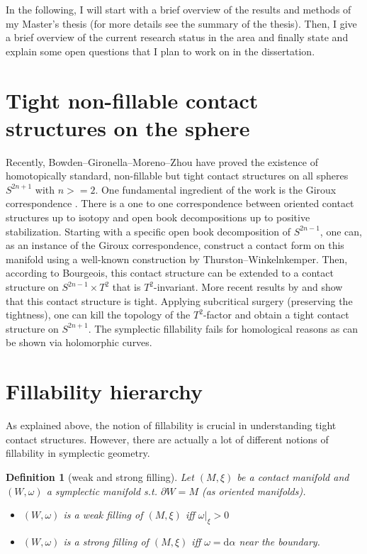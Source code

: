 \documentclass{amsart}
\newtheorem{definition}{Definition}
\renewcommand*{\d}{\mathrm{d}}
\begin{document}
In the following, I will start with a brief overview of the results and methods of my Master's thesis (for more details see the summary of the thesis).
Then, I give a brief overview of the current research status in the area and
finally state and explain some open questions that I plan to work on in the dissertation.

\section*{Tight non-fillable contact structures on the sphere}

Recently, Bowden--Gironella--Moreno--Zhou \cite{BGMZ22} have proved the existence of homotopically standard, non-fillable but tight contact structures on all spheres $S^{2n+1}$ with $n >= 2$. 
One fundamental ingredient of the work is the Giroux correspondence \cite{Giroux02}.
There is a one to one correspondence between oriented contact structures up to isotopy
and open book decompositions up to positive stabilization.
Starting with a specific open book decomposition of $S^{2n-1}$, one can, as an instance of the Giroux correspondence, construct a contact form on this manifold using a well-known construction by Thurston--Winkelnkemper. 
Then, according to Bourgeois, this contact structure can be extended to a contact structure on $S^{2n-1}\times T^2$ that is $T^2$-invariant.
More recent results by \cite{BGM22} and \cite{AZ24} show that this contact structure is tight.
Applying subcritical surgery (preserving the tightness), one can kill the topology of the $T^2$-factor and obtain a tight contact structure on $S^{2n+1}$.
The symplectic fillability fails for homological reasons as can be shown via holomorphic curves.


\section*{Fillability hierarchy}
As explained above, the notion of fillability is crucial in understanding tight contact structures. However, there are actually a lot of different notions of fillability in symplectic geometry.

\begin{definition}[weak and strong filling]
    Let $(M, \xi)$ be a contact manifold and $(W, \omega)$ a symplectic manifold s.t. $\partial W = M$ (as oriented manifolds).
    \begin{itemize}
        \item $(W, \omega)$ is a weak filling of $(M, \xi)$ iff $\omega|_\xi > 0$
        \item $(W, \omega)$ is a strong filling of $(M, \xi)$ iff $\omega = \d \alpha$ near the boundary.
    \end{itemize}
\end{definition}
\end{document}

